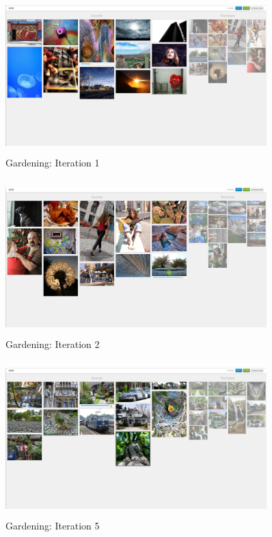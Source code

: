 \documentclass[english]{tktltiki}
\begin{document}
\begin{figure}[!h]
  \centering
    \includegraphics[width=0.90\textwidth,height=6cm]{figures/gardening_1.jpg}
    \caption{Gardening: Iteration 1}
    \label{gardening_1}
\end{figure}

\begin{figure}[!h]
  \centering
    \includegraphics[width=0.90\textwidth,height=6cm]{figures/gardening_2.jpg}
    \caption{Gardening: Iteration 2}
    \label{gardening_2}
\end{figure}

\begin{figure}[!h]
  \centering
    \includegraphics[width=0.90\textwidth,height=6cm]{figures/gardening_5.jpg}
    \caption{Gardening: Iteration 5}
    \label{gardening_5}
\end{figure}
\end{document}
